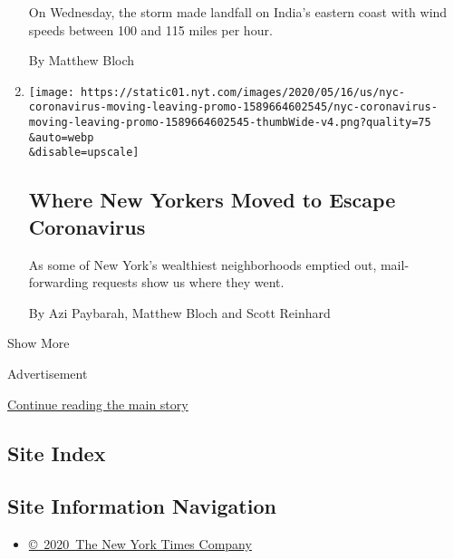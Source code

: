 \begin{enumerate}
  On Wednesday, the storm made landfall on India's eastern coast with
  wind speeds between 100 and 115 miles per hour.

  By Matthew Bloch
\item
  \href{/interactive/2020/05/16/nyregion/nyc-coronavirus-moving-leaving.html}{}

  \texttt{[image: https://static01.nyt.com/images/2020/05/16/us/nyc-coronavirus-moving-leaving-promo-1589664602545/nyc-coronavirus-moving-leaving-promo-1589664602545-thumbWide-v4.png?quality=75\\\&auto=webp\\\&disable=upscale]}

  \hypertarget{where-new-yorkers-moved-to-escape-coronavirus}{%
  \subsection{Where New Yorkers Moved to Escape
  Coronavirus}\label{where-new-yorkers-moved-to-escape-coronavirus}}

  As some of New York's wealthiest neighborhoods emptied out,
  mail-forwarding requests show us where they went.

  By Azi Paybarah, Matthew Bloch and Scott Reinhard
\end{enumerate}

Show More

Advertisement

\protect\hyperlink{after-mid2}{Continue reading the main story}

\hypertarget{site-index}{%
\subsection{Site Index}\label{site-index}}

\hypertarget{site-information-navigation}{%
\subsection{Site Information
Navigation}\label{site-information-navigation}}

\begin{itemize}
\tightlist
\item
  \href{https://help.nytimes.com/hc/en-us/articles/115014792127-Copyright-notice}{©~2020~The
  New York Times Company}
\end{itemize}

